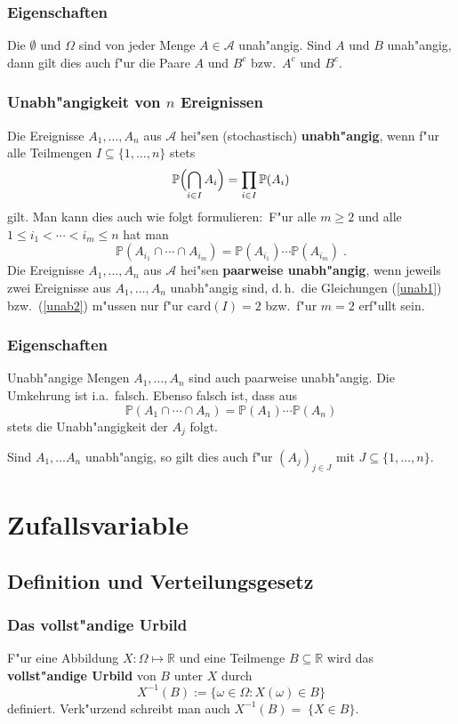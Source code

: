 \documentclass[ngerman,draft,parskip=half,twoside]{scrartcl}
\newcommand*{\R}{\mathbb{R}}      %
\newcommand*{\Algeb}{\mathcal{A}}   %
\newcommand*{\WKM}{\mathbb{P}}      %
\begin{document}
\subsubsection{Eigenschaften}
Die $\emptyset$ und $\Omega$ sind von jeder Menge $A\in\Algeb$ unah"angig. Sind
$A$ und $B$ unah"angig, dann gilt dies auch f"ur die Paare $A$ und $B^c$ bzw.~$A^c$ und $B^c$.
\subsubsection{Unabh"angigkeit von $n$ Ereignissen}
Die Ereignisse $A_1,\ldots,A_n$ aus $\Algeb$ hei"sen (stochastisch) \textbf{unabh"angig},
wenn f"ur alle Teilmengen $I\subseteq\{1,\ldots,n\}$ stets
\begin{equation}
\label{unab1}
\WKM\Bigl(\bigcap_{i\in I} A_i\Bigr)= \prod_{i\in I}\WKM(A_i)
\end{equation}
gilt. Man kann dies auch wie folgt formulieren$\colon$ F"ur alle $m\ge 2$ und alle
$1\le i_1<\cdots<i_m\le n$ hat man
\begin{equation}
\label{unab2}
\WKM(A_{i_1}\cap\cdots\cap A_{i_m})= \WKM(A_{i_1})\cdots\WKM(A_{i_m})\;.
\end{equation}
Die Ereignisse $A_1,\ldots,A_n$ aus $\Algeb$ hei"sen \textbf{paarweise unabh"angig}, wenn
jeweils zwei Ereignisse aus $A_1,\ldots,A_n$ unabh"angig sind, d.\,h.~die Gleichungen
(\ref{unab1}) bzw.~(\ref{unab2}) m"ussen nur f"ur $\mathrm{card}(I)=2$ bzw.~f"ur $m=2$ erf"ullt sein.
\subsubsection{Eigenschaften}
Unabh"angige Mengen $A_1,\ldots,A_n$ sind auch paarweise unabh"angig. Die Umkehrung ist
i.a.~falsch. Ebenso falsch ist, dass aus
$$
\WKM(A_{1}\cap\cdots\cap A_{n})= \WKM(A_{1})\cdots\WKM(A_{n})
$$
stets die Unabh"angigkeit der $A_j$ folgt.

Sind $A_1,\ldots A_n$ unabh"angig, so gilt dies auch f"ur $(A_j)_{j\in J}$  mit
$J\subseteq \{1,\ldots,n\}$.

\section{Zufallsvariable}
\subsection{Definition und Verteilungsgesetz}

\subsubsection{Das vollst"andige Urbild}
F"ur eine Abbildung $X\colon\Omega\mapsto\R$ und eine Teilmenge $B\subseteq\R$ wird das
\textbf{vollst"andige Urbild} von $B$ unter $X$ durch
$$
X^{-1}(B):=\{\omega\in\Omega : X(\omega)\in B\}
$$
definiert. Verk"urzend schreibt man auch $X^{-1}(B)=\;\{X\in B\}$.
\end{document}
